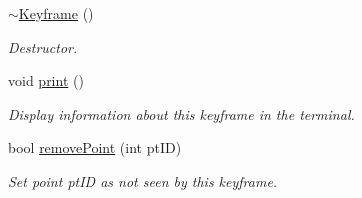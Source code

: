 \begin{DoxyCompactItemize}
\mbox{\label{classKeyframe_a24445f11306b884c02cdaa26ff8b7fbc}} 
\hyperlink{classKeyframe_a24445f11306b884c02cdaa26ff8b7fbc}{$\sim$\+Keyframe} ()
\begin{DoxyCompactList}\small\item\em Destructor. \end{DoxyCompactList}\item 
\mbox{\label{classKeyframe_a40109559c97d332f45a14ab18bfbc98a}} 
void \hyperlink{classKeyframe_a40109559c97d332f45a14ab18bfbc98a}{print} ()
\begin{DoxyCompactList}\small\item\em Display information about this keyframe in the terminal. \end{DoxyCompactList}\item 
\mbox{\label{classKeyframe_add1b9a9d0593c5bf958036dccde5f0f2}} 
bool \hyperlink{classKeyframe_add1b9a9d0593c5bf958036dccde5f0f2}{remove\+Point} (int pt\+ID)
\begin{DoxyCompactList}\small\item\em Set point pt\+ID as not seen by this keyframe. \end{DoxyCompactList}\end{DoxyCompactItemize}
